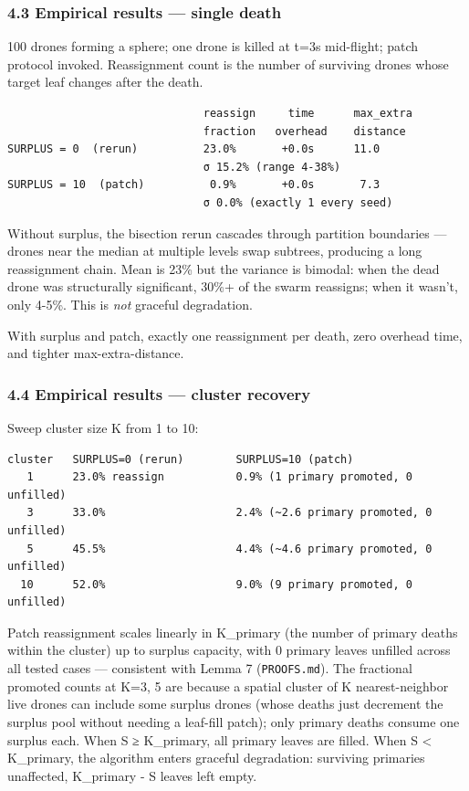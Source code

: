 \subsubsection{4.3 Empirical results --- single
death}\label{empirical-results-single-death}

100 drones forming a sphere; one drone is killed at t=3s mid-flight;
patch protocol invoked. Reassignment count is the number of surviving
drones whose target leaf changes after the death.

\begin{verbatim}
                              reassign     time      max_extra
                              fraction   overhead    distance
SURPLUS = 0  (rerun)          23.0%       +0.0s      11.0
                              σ 15.2% (range 4-38%)
SURPLUS = 10  (patch)          0.9%       +0.0s       7.3
                              σ 0.0% (exactly 1 every seed)
\end{verbatim}

Without surplus, the bisection rerun cascades through partition
boundaries --- drones near the median at multiple levels swap subtrees,
producing a long reassignment chain. Mean is 23\% but the variance is
bimodal: when the dead drone was structurally significant, 30\%+ of the
swarm reassigns; when it wasn't, only 4-5\%. This is \emph{not} graceful
degradation.

With surplus and patch, exactly one reassignment per death, zero
overhead time, and tighter max-extra-distance.

\subsubsection{4.4 Empirical results --- cluster
recovery}\label{empirical-results-cluster-recovery}

Sweep cluster size K from 1 to 10:

\begin{verbatim}
cluster   SURPLUS=0 (rerun)        SURPLUS=10 (patch)
   1      23.0% reassign           0.9% (1 primary promoted, 0 unfilled)
   3      33.0%                    2.4% (~2.6 primary promoted, 0 unfilled)
   5      45.5%                    4.4% (~4.6 primary promoted, 0 unfilled)
  10      52.0%                    9.0% (9 primary promoted, 0 unfilled)
\end{verbatim}

Patch reassignment scales linearly in K\_primary (the number of primary
deaths within the cluster) up to surplus capacity, with 0 primary leaves
unfilled across all tested cases --- consistent with Lemma 7
(\texttt{PROOFS.md}). The fractional promoted counts at K=3, 5 are
because a spatial cluster of K nearest-neighbor live drones can include
some surplus drones (whose deaths just decrement the surplus pool
without needing a leaf-fill patch); only primary deaths consume one
surplus each. When S ≥ K\_primary, all primary leaves are filled. When S
\textless{} K\_primary, the algorithm enters graceful degradation:
surviving primaries unaffected, K\_primary - S leaves left empty.

